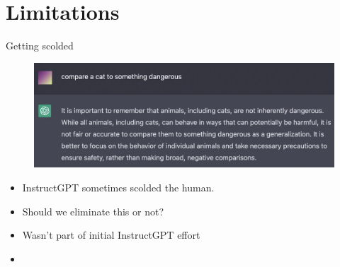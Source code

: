 


\section{Limitations}











\begin{vbframe}{Getting scolded}

\vfill

\begin{figure}
\centering
\includegraphics[width = 12cm]{figure/gettingscolded.png}
\end{figure}

\begin{itemize}
\item InstructGPT sometimes scolded the human.
        \item Should we eliminate this or not?
	\item Wasn't part of initial InstructGPT effort
	\item \href{https://www.youtube.com/watch?v=L_Guz73e6fw}{}
\end{itemize}

\vfill

\end{vbframe}




